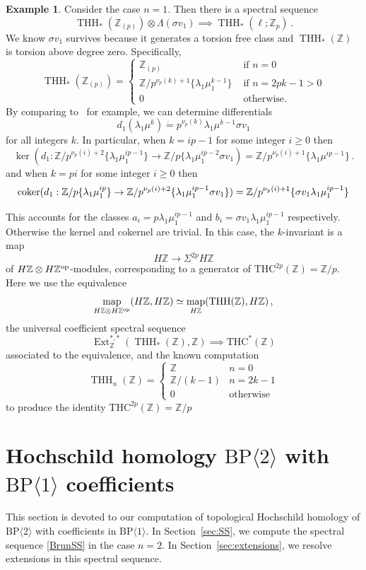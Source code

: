 \documentclass[11pt]{amsart}
\newcommand{\mr}[1]{\mathrm{#1}}
\newcommand{\bZ}{\mathbb{Z}}
\newcommand{\THC}{\mathrm{THC}}
\newcommand{\BP}{\mr{BP}}
\DeclareMathOperator{\Ext}{Ext}
\DeclareMathOperator{\map}{map}
\DeclareMathOperator{\THH}{THH}
\newcommand{\op}{\textup{op}}
\theoremstyle{definition}
\newtheorem{example}[equation]{Example}
\numberwithin{equation}{section}
\numberwithin{figure}{section}
\begin{document}
\begin{example}
Consider the case $n=1$. Then there is a spectral sequence 
\[ 
\THH_{*}(\mathbb{Z}_{(p)})\otimes \Lambda (\sigma v_{1})\implies \THH_{*}(\ell;\mathbb{Z}_{p}) \,.
\]
We know $\sigma v_1$ survives because it generates a torsion free class and $\THH_*(\mathbb{Z})$ is torsion above degree zero. Specifically, 
\[
\THH_*(\mathbb{Z}_{(p)})=\begin{cases} \mathbb{Z}_{(p)} & \text{ if } n=0 \\ 
\mathbb{Z}/p^{\nu_p(k)+1}\{\lambda_1\mu_1^{k-1}\} & \text{ if } n=2pk-1>0 \\ 
0 & \text{ otherwise.}
\end{cases}
\]
By comparing to~\cite{AHL10} for example, we can determine differentials 
\[
d_1(\lambda_1\mu^{k})\dot{=}p^{\nu_p(k)}\lambda_1\mu^{k-1}\sigma v_1 
\]
for all integers $k$. 
In particular, when $k=ip-1$ for some integer $i\ge 0$ then 
\[ 
\ker
(d_1 :\mathbb{Z}/p^{\nu_p(i)+2}\{\lambda_1\mu_1^{ip-1}\}\to \mathbb{Z}/p\{\lambda_1\mu_1^{ip-2}\sigma v_1) = \mathbb{Z}/p^{\nu_p(i)+1}\{\lambda_1\mu^{ip-1}\} \,.
\]
and when $k=pi$ for some integer $i\ge 0$ then 
\[ 
\textup{coker} 
(d_1 :\mathbb{Z}/p\{\lambda_1\mu_1^{ip}\}\to \mathbb{Z}/p^{\nu_p(i)+2}\{\lambda_1 \mu_1^{ip-1}\sigma v_1 \}) = \mathbb{Z}/p^{\nu_p(i)+1}\{\sigma v_1\lambda_1\mu_1^{ip-1}\}
\]

This accounts for the classes $a_i=p\lambda_1\mu_1^{ip-1}$ and $b_i=\sigma v_1\lambda_1\mu_1^{ip-1}$ respectively. Otherwise the kernel and cokernel are trivial. In this case, the $k$-invariant is a map 
\[ H\mathbb{Z}\to \Sigma^{2p} H\mathbb{Z}\]
of $ H\mathbb{Z}\otimes H\mathbb{Z}^{\op}$-modules, corresponding to a generator of $\mathrm{THC}^{2p}(\bZ)=\mathbb{Z}/p$. Here we use the equivalence 
\[ 
\map_{H\bZ\otimes H\bZ^{\op}}(H\bZ,H\bZ)\simeq \map_{H\bZ}(\THH(\bZ),H\bZ) \,,
\]
the universal coefficient spectral sequence 
\[ 
\Ext_{\mathbb{Z}}^{*,*}(\THH_*(\mathbb{Z}),\mathbb{Z})\implies \THC^*(\mathbb{Z})
\]
associated to the equivalence, and the known computation 
\[
    \THH_n(\mathbb{Z})=\begin{cases} \mathbb{Z} &n=0 \\ 
    \mathbb{Z}/(k-1) &n=2k-1 \\ 
    0 & \text{otherwise}
    \end{cases}
\]
to produce the identity $\mathrm{THC}^{2p}(\mathbb{Z})=\mathbb{Z}/p$
\end{example}
\section{Hochschild homology  \texorpdfstring{$\BP\langle 2\rangle$}{BP2} with \texorpdfstring{$\BP\langle 1\rangle$}{BP1} coefficients}\label{THH}
This section is devoted to our computation of topological Hochschild homology of $\BP\langle 2\rangle$ with coefficients in $\BP\langle 1\rangle$. In Section~\ref{sec:SS}, we compute the spectral sequence \eqref{BrunSS} in the case $n=2$. In Section~\ref{sec:extensions}, we resolve extensions in this spectral sequence. 
\end{document}
